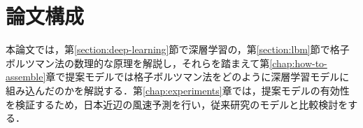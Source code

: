 \section{論文構成}
本論文では，第\ref{section:deep-learning}節で深層学習の，第\ref{section:lbm}節で格子ボルツマン法の数理的な原理を解説し，それらを踏まえて第\ref{chap:how-to-assemble}章で提案モデルでは格子ボルツマン法をどのように深層学習モデルに組み込んだのかを解説する．第\ref{chap:experiments}章では，提案モデルの有効性を検証するため，日本近辺の風速予測を行い，従来研究のモデルと比較検討をする．